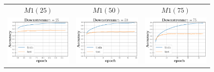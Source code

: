 \begin{figure}[h]
\begin{minipage}{0.99\columnwidth}
\begin{tabular}{ccc}
\\
 $M1(25)$ & $M1(50)$ &  $M1(75)$\\
\includegraphics[scale=0.3]{figs/relu_25_good.pdf}&
\includegraphics[scale=0.3]{figs/relu_50_good.pdf}&
\includegraphics[scale=0.3]{figs/relu_75_good.pdf}\\

\end{tabular}
\end{minipage}
\end{figure}
